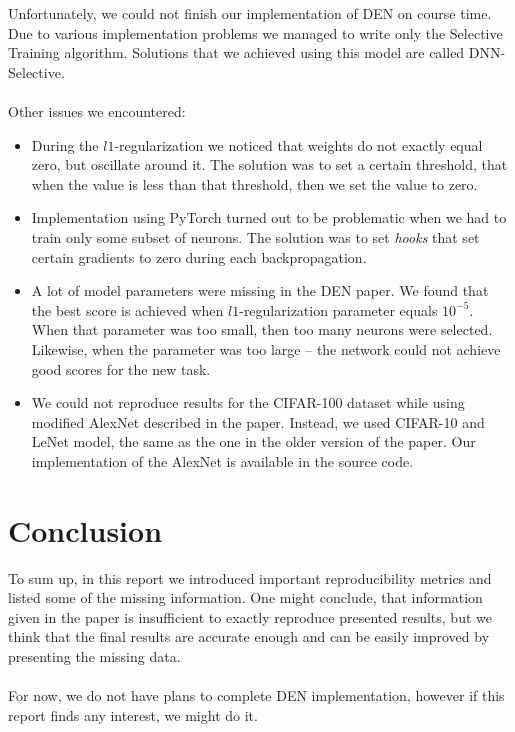 \documentclass[12pt]{article}
\begin{document}
    Unfortunately, we could not finish our implementation of DEN on course time. Due to various implementation
    problems we managed to write only the Selective Training algorithm. Solutions that we achieved using this
    model are called DNN-Selective.
    \\
    \\
    Other issues we encountered:

    \begin{itemize}
        \item During the $l1$-regularization we noticed that weights do not exactly equal zero, but
        oscillate around it. The solution was to set a certain threshold, that when the value is less than
        that threshold, then we set the value to zero.
        \item Implementation using PyTorch turned out to be problematic when we had to train only
        some subset of neurons. The solution was to set \textit{hooks} that set certain gradients to zero
        during each backpropagation.
        \item A lot of model parameters were missing in the DEN paper. We found that the best score is
        achieved when $l1$-regularization parameter equals $10^{-5}$. When that parameter was too small,
        then too many neurons were selected. Likewise, when the parameter was too large -- the network
        could not achieve good scores for the new task.
        \item We could not reproduce results for the CIFAR-100 dataset while using modified AlexNet described
        in the paper. Instead, we used CIFAR-10 and LeNet model, the same as the one in the older version
        of the paper. Our implementation of the AlexNet is available in the source code.
    \end{itemize}

    \section {Conclusion}
    
    To sum up, in this report we introduced important reproducibility metrics and listed some of the
    missing information. One might conclude, that information given in the paper is insufficient to exactly reproduce 
    presented results, but we think that the final results are accurate enough and can be easily improved
    by presenting the missing data.
    \\
    \\
    For now, we do not have plans to complete DEN implementation, however if this report finds any interest,
    we might do it.
\end{document}
